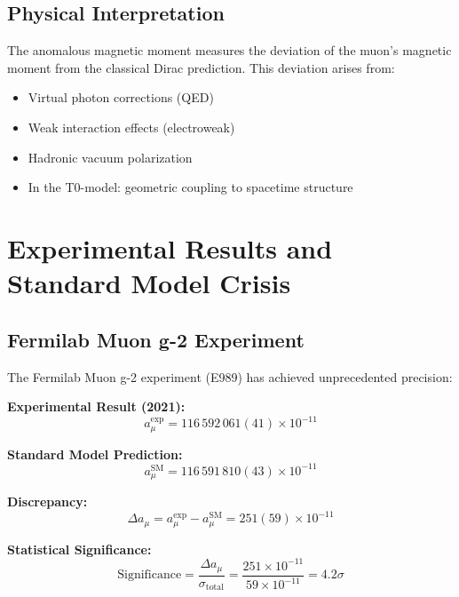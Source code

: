 \documentclass[12pt,a4paper]{report}
\begin{document}
\subsection{Physical Interpretation}
\label{subsec:physical_interpretation}

The anomalous magnetic moment measures the deviation of the muon's magnetic moment from the classical Dirac prediction. This deviation arises from:
\begin{itemize}
	\item Virtual photon corrections (QED)
	\item Weak interaction effects (electroweak)
	\item Hadronic vacuum polarization
	\item In the T0-model: geometric coupling to spacetime structure
\end{itemize}

\section{Experimental Results and Standard Model Crisis}
\label{sec:experimental_results}

\subsection{Fermilab Muon g-2 Experiment}
\label{subsec:fermilab_results}

The Fermilab Muon g-2 experiment (E989) has achieved unprecedented precision:

\textbf{Experimental Result (2021):}
\begin{equation}
	a_\mu^{\text{exp}} = 116\,592\,061(41) \times 10^{-11}
	\label{eq:experimental_value}
\end{equation}

\textbf{Standard Model Prediction:}
\begin{equation}
	a_\mu^{\text{SM}} = 116\,591\,810(43) \times 10^{-11}
	\label{eq:sm_prediction}
\end{equation}

\textbf{Discrepancy:}
\begin{equation}
	\Delta a_\mu = a_\mu^{\text{exp}} - a_\mu^{\text{SM}} = 251(59) \times 10^{-11}
	\label{eq:discrepancy}
\end{equation}

\textbf{Statistical Significance:}
\begin{equation}
	\text{Significance} = \frac{\Delta a_\mu}{\sigma_{\text{total}}} = \frac{251 \times 10^{-11}}{59 \times 10^{-11}} = 4.2\sigma
	\label{eq:significance}
\end{equation}
\end{document}
